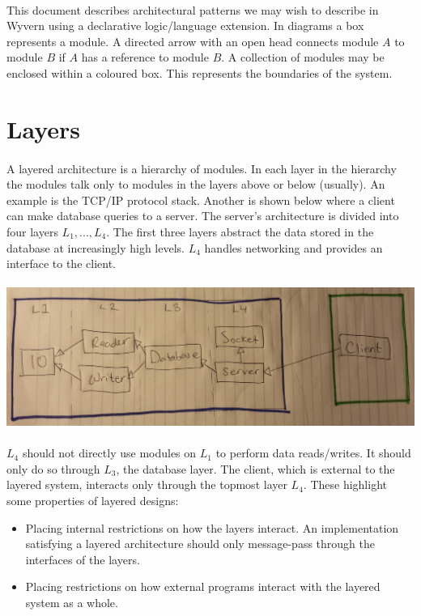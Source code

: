 \documentclass{article}
\begin{document}
\paragraph{}
This document describes architectural patterns we may wish to describe in Wyvern using a declarative logic/language extension. In diagrams a box represents a module. A directed arrow with an open head connects module $A$ to module $B$ if $A$ has a reference to module $B$. A collection of modules may be enclosed within a coloured box. This represents the boundaries of the system.

\section{Layers}

\paragraph{}
A layered architecture is a hierarchy of modules. In each layer in the hierarchy the modules talk only to modules in the layers above or below (usually). An example is the TCP/IP protocol stack. Another is shown below where a client can make database queries to a server. The server's architecture is divided into four layers $L_1, ..., L_4$. The first three layers abstract the data stored in the database at increasingly high levels. $L_4$ handles networking and provides an interface to the client.

\paragraph{}
\includegraphics[width=\textwidth]{layers.jpeg}

\paragraph{}
$L_4$ should not directly use modules on $L_1$ to perform data reads/writes. It should only do so through $L_3$, the database layer. The client, which is external to the layered system, interacts only through the topmost layer $L_4$. These highlight some properties of layered designs:
\begin{itemize}
	\item Placing internal restrictions on how the layers interact. An implementation satisfying a layered architecture should only message-pass through the interfaces of the layers.
	\item Placing restrictions on how external programs interact with the layered system as a whole.
\end{itemize}
\end{document}
